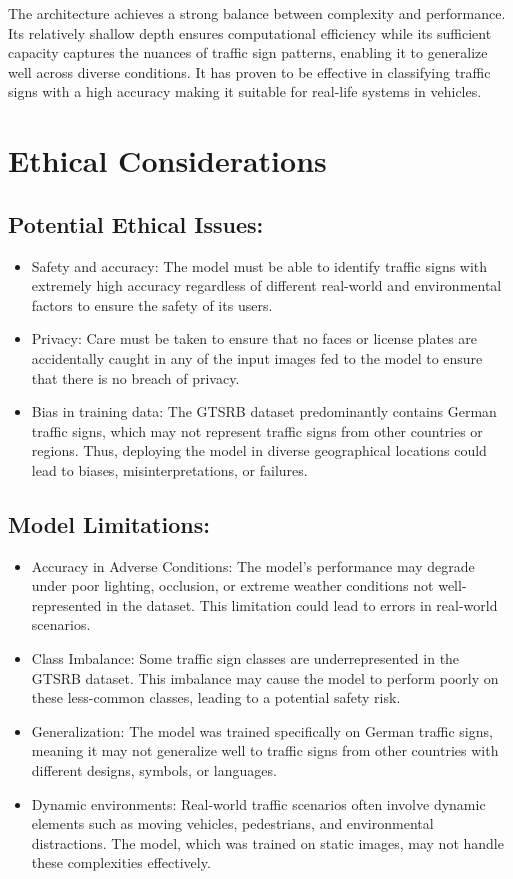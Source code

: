 \documentclass{article} %
\begin{document}
The architecture achieves a strong balance between complexity and performance. Its relatively shallow depth ensures computational efficiency while its sufficient capacity captures the nuances of traffic sign patterns, enabling it to generalize well across diverse conditions. It has proven to be effective in classifying traffic signs with a high accuracy making it suitable for real-life systems in vehicles. 


\section{Ethical Considerations}
\subsection{Potential Ethical Issues:} 
\begin{itemize}
    \item Safety and accuracy: The model must be able to identify traffic signs with extremely high accuracy regardless of different real-world and environmental factors to ensure the safety of its users.
    \item Privacy: Care must be taken to ensure that no faces or license plates are accidentally caught in any of the input images fed to the model to ensure that there is no breach of privacy.
    \item Bias in training data: The GTSRB dataset predominantly contains German traffic signs, which may not represent traffic signs from other countries or regions. Thus, deploying the model in diverse geographical locations could lead to biases, misinterpretations, or failures.
\end{itemize}
\subsection{Model Limitations:}  
\begin{itemize}
    \item Accuracy in Adverse Conditions: The model's performance may degrade under poor lighting, occlusion, or extreme weather conditions not well-represented in the dataset. This limitation could lead to errors in real-world scenarios.
    \item Class Imbalance: Some traffic sign classes are underrepresented in the GTSRB dataset. This imbalance may cause the model to perform poorly on these less-common classes, leading to a potential safety risk.
    \item Generalization: The model was trained specifically on German traffic signs, meaning it may not generalize well to traffic signs from other countries with different designs, symbols, or languages.
    \item Dynamic environments: Real-world traffic scenarios often involve dynamic elements such as moving vehicles, pedestrians, and environmental distractions. The model, which was trained on static images, may not handle these complexities effectively.
\end{itemize}
\end{document}
